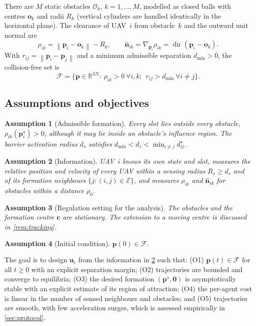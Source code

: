 \documentclass[11pt]{article}
\newtheorem{assumption}{Assumption}
\theoremstyle{definition}
\theoremstyle{remark}
\newcommand{\R}{\mathbb{R}}
\newcommand{\bp}{\mathbf{p}}
\newcommand{\bu}{\mathbf{u}}
\newcommand{\bn}{\hat{\mathbf{n}}}
\newcommand{\norm}[1]{\left\lVert #1 \right\rVert}
\newcommand{\dmin}{d_{\min}}
\newcommand{\Free}{\mathcal{F}}
\begin{document}
There are $M$ static obstacles $\mathcal{O}_k$, $k=1,\dots,M$, modelled as closed
balls with centres $\mathbf{o}_k$ and radii $R_k$ (vertical cylinders are
handled identically in the horizontal plane). The clearance of UAV~$i$ from
obstacle~$k$ and the outward unit normal are
\begin{equation}
  \rho_{ik}=\norm{\bp_i-\mathbf{o}_k}-R_k,\qquad \bn_{ik}=\nabla_{\bp_i}\rho_{ik}=\operatorname{dir}(\bp_i-\mathbf{o}_k).
\end{equation}
With $r_{ij}=\norm{\bp_i-\bp_j}$ and a minimum admissible separation $\dmin>0$,
the collision-free set is
\begin{equation}
  \Free=\bigl\{\bp\in\R^{3N}:\ \rho_{ik}>0\ \forall i,k;\ \ r_{ij}>\dmin\ \forall i\neq j\bigr\}.
\end{equation}

\subsection{Assumptions and objectives}
\begin{assumption}[Admissible formation]\label{as:formation}
Every slot lies outside every obstacle, $\rho_{ik}(\bp_i^\star)>0$, although it
may lie inside an obstacle's influence region. The barrier activation radius
$d_s$ satisfies $\dmin<d_s<\min_{i\neq j}d_{ij}^\star$.
\end{assumption}
\begin{assumption}[Information]\label{as:info}
UAV~$i$ knows its own state and slot, measures the relative position and
velocity of every UAV within a sensing radius $R_s\ge d_s$ and of its formation
neighbours $\{j:(i,j)\in\mathcal{E}\}$, and measures $\rho_{ik}$ and $\bn_{ik}$
for obstacles within a distance $\rho_0$.
\end{assumption}
\begin{assumption}[Regulation setting for the analysis]\label{as:static}
The obstacles and the formation centre $\mathbf{c}$ are stationary.
The extension to a moving centre is discussed in \cref{rem:tracking}.
\end{assumption}
\begin{assumption}[Initial condition]\label{as:init}
$\bp(0)\in\Free$.
\end{assumption}

\noindent The goal is to design $\bu_i$ from the information in \cref{as:info}
such that: (O1) $\bp(t)\in\Free$ for all $t\ge0$ with an explicit separation
margin; (O2) trajectories are bounded and converge to equilibria; (O3) the
desired formation $(\bp^\star,\mathbf{0})$ is asymptotically stable with an
explicit estimate of its region of attraction; (O4) the per-agent cost is
linear in the number of sensed neighbours and obstacles; and (O5) trajectories
are smooth, with few acceleration surges, which is assessed empirically in
\cref{sec:protocol}.
\end{document}
